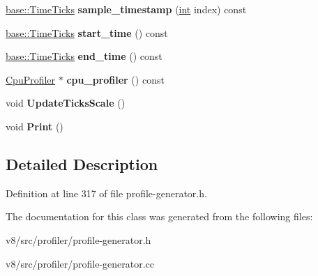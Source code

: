 \begin{DoxyCompactItemize}
\item 
\mbox{\label{classv8_1_1internal_1_1CpuProfile_a102eed49ebe8a22025a3648178023d22}} 
\mbox{\hyperlink{classv8_1_1base_1_1TimeTicks}{base\+::\+Time\+Ticks}} {\bfseries sample\+\_\+timestamp} (\mbox{\hyperlink{classint}{int}} index) const
\item 
\mbox{\label{classv8_1_1internal_1_1CpuProfile_a2809207f0958ded5c674fd1b5488ed28}} 
\mbox{\hyperlink{classv8_1_1base_1_1TimeTicks}{base\+::\+Time\+Ticks}} {\bfseries start\+\_\+time} () const
\item 
\mbox{\label{classv8_1_1internal_1_1CpuProfile_aa4a9adac1c65ebc26a08a65fcd2633db}} 
\mbox{\hyperlink{classv8_1_1base_1_1TimeTicks}{base\+::\+Time\+Ticks}} {\bfseries end\+\_\+time} () const
\item 
\mbox{\label{classv8_1_1internal_1_1CpuProfile_a7069d283f0aaff823f99cec0ff2bcfd3}} 
\mbox{\hyperlink{classv8_1_1internal_1_1CpuProfiler}{Cpu\+Profiler}} $\ast$ {\bfseries cpu\+\_\+profiler} () const
\item 
\mbox{\label{classv8_1_1internal_1_1CpuProfile_a66f5b3ad5fe0fcf040e8274e5238441d}} 
void {\bfseries Update\+Ticks\+Scale} ()
\item 
\mbox{\label{classv8_1_1internal_1_1CpuProfile_a5dc2db626ffd25bf1db98cc0aa9ca906}} 
void {\bfseries Print} ()
\end{DoxyCompactItemize}


\subsection{Detailed Description}


Definition at line 317 of file profile-\/generator.\+h.



The documentation for this class was generated from the following files\+:\begin{DoxyCompactItemize}
\item 
v8/src/profiler/profile-\/generator.\+h\item 
v8/src/profiler/profile-\/generator.\+cc\end{DoxyCompactItemize}
